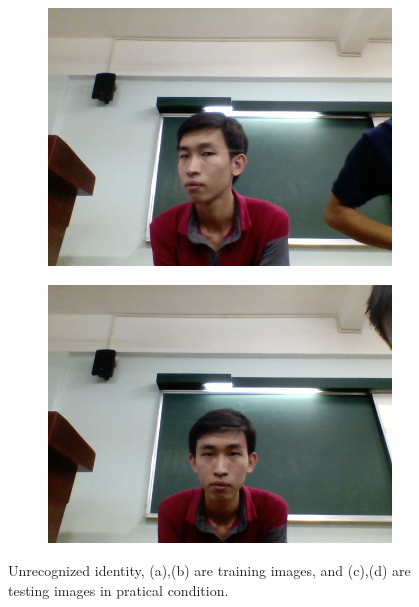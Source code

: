 \documentclass[journal, twocolumn]{IEEEtran}
\begin{document}
\begin{figure}[h!]
\begin{subfigure}[b]{0.35\linewidth}
    \includegraphics[width=\linewidth]{img/3.png}
    \caption{}
  \end{subfigure}
    \begin{subfigure}[b]{0.35\linewidth}
    \includegraphics[width=\linewidth]{img/4.png}
    \caption{}
  \end{subfigure}
  \caption{Unrecognized identity, (a),(b) are training images, and (c),(d) are testing images in pratical condition.} 
  \label{fig:compare}
\end{figure}
\end{document}
